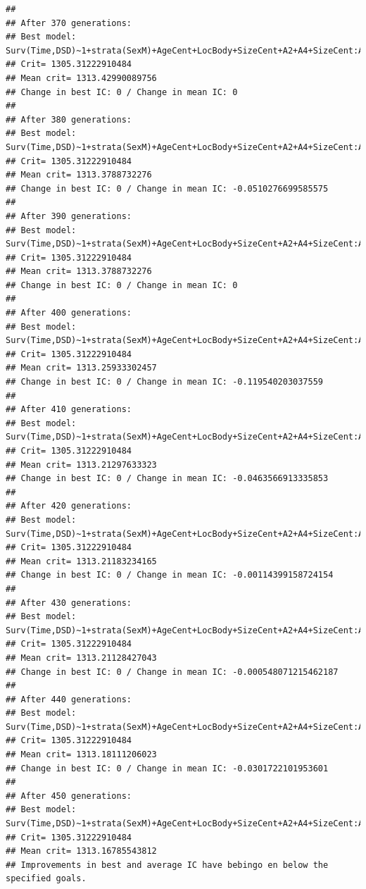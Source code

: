 \documentclass{article}\usepackage[]{graphicx}\usepackage[]{color}
\makeatletter
\newenvironment{kframe}{%
 \def\at@end@of@kframe{}%
 \ifinner\ifhmode%
  \def\at@end@of@kframe{\end{minipage}}%
  \begin{minipage}{\columnwidth}%
 \fi\fi%
 \def\FrameCommand##1{\hskip\@totalleftmargin \hskip-\fboxsep
 \colorbox{shadecolor}{##1}\hskip-\fboxsep
     \hskip-\linewidth \hskip-\@totalleftmargin \hskip\columnwidth}%
 \MakeFramed {\advance\hsize-\width
   \@totalleftmargin\z@ \linewidth\hsize
   \@setminipage}}%
 {\par\unskip\endMakeFramed%
 \at@end@of@kframe}
\newenvironment{knitrout}{}{} %
\makeatother
\begin{document}
\begin{knitrout}
\begin{kframe}
{\ttfamily\noindent\color{warningcolor}{\#\# Warning in fitter(X, Y, strats, offset, init, control, weights = weights, : Loglik converged before variable\ \ 11 ; beta may be infinite.}}\begin{verbatim}
## 
## After 370 generations:
## Best model: Surv(Time,DSD)~1+strata(SexM)+AgeCent+LocBody+SizeCent+A2+A4+SizeCent:AgeCent+strata(SexM):SizeCent
## Crit= 1305.31222910484
## Mean crit= 1313.42990089756
## Change in best IC: 0 / Change in mean IC: 0
## 
## After 380 generations:
## Best model: Surv(Time,DSD)~1+strata(SexM)+AgeCent+LocBody+SizeCent+A2+A4+SizeCent:AgeCent+strata(SexM):SizeCent
## Crit= 1305.31222910484
## Mean crit= 1313.3788732276
## Change in best IC: 0 / Change in mean IC: -0.0510276699585575
## 
## After 390 generations:
## Best model: Surv(Time,DSD)~1+strata(SexM)+AgeCent+LocBody+SizeCent+A2+A4+SizeCent:AgeCent+strata(SexM):SizeCent
## Crit= 1305.31222910484
## Mean crit= 1313.3788732276
## Change in best IC: 0 / Change in mean IC: 0
## 
## After 400 generations:
## Best model: Surv(Time,DSD)~1+strata(SexM)+AgeCent+LocBody+SizeCent+A2+A4+SizeCent:AgeCent+strata(SexM):SizeCent
## Crit= 1305.31222910484
## Mean crit= 1313.25933302457
## Change in best IC: 0 / Change in mean IC: -0.119540203037559
## 
## After 410 generations:
## Best model: Surv(Time,DSD)~1+strata(SexM)+AgeCent+LocBody+SizeCent+A2+A4+SizeCent:AgeCent+strata(SexM):SizeCent
## Crit= 1305.31222910484
## Mean crit= 1313.21297633323
## Change in best IC: 0 / Change in mean IC: -0.0463566913335853
## 
## After 420 generations:
## Best model: Surv(Time,DSD)~1+strata(SexM)+AgeCent+LocBody+SizeCent+A2+A4+SizeCent:AgeCent+strata(SexM):SizeCent
## Crit= 1305.31222910484
## Mean crit= 1313.21183234165
## Change in best IC: 0 / Change in mean IC: -0.00114399158724154
## 
## After 430 generations:
## Best model: Surv(Time,DSD)~1+strata(SexM)+AgeCent+LocBody+SizeCent+A2+A4+SizeCent:AgeCent+strata(SexM):SizeCent
## Crit= 1305.31222910484
## Mean crit= 1313.21128427043
## Change in best IC: 0 / Change in mean IC: -0.000548071215462187
## 
## After 440 generations:
## Best model: Surv(Time,DSD)~1+strata(SexM)+AgeCent+LocBody+SizeCent+A2+A4+SizeCent:AgeCent+strata(SexM):SizeCent
## Crit= 1305.31222910484
## Mean crit= 1313.18111206023
## Change in best IC: 0 / Change in mean IC: -0.0301722101953601
## 
## After 450 generations:
## Best model: Surv(Time,DSD)~1+strata(SexM)+AgeCent+LocBody+SizeCent+A2+A4+SizeCent:AgeCent+strata(SexM):SizeCent
## Crit= 1305.31222910484
## Mean crit= 1313.16785543812
## Improvements in best and average IC have bebingo en below the specified goals.

\end{verbatim}
\end{kframe}
\end{knitrout}
\end{document}
